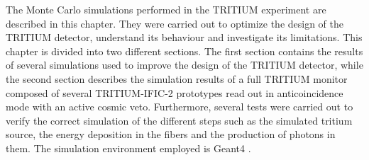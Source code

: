 The Monte Carlo simulations performed in the TRITIUM experiment are described in this chapter. They were carried out to optimize the design of the TRITIUM detector, understand its behaviour and investigate its limitations. This chapter is divided into two different sections. The first section contains the results of several simulations used to improve the design of the TRITIUM detector, while the second section describes the simulation results of a full TRITIUM monitor composed of several TRITIUM-IFIC-2 prototypes read out in anticoincidence mode with an active cosmic veto. Furthermore, several tests were carried out to verify the correct simulation of the different steps such as the simulated tritium source, the energy deposition in the fibers and the production of photons in them. The simulation environment employed is Geant4 \cite{Geant4WebPage, Geant4P}.